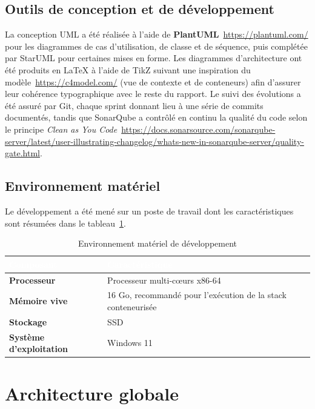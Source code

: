 \documentclass[12pt,a4paper]{report}
\renewcommand{\thead}[1]{\cellcolor{espritblue}\textcolor{white}{\textbf{#1}}}
\begin{document}
\subsection{Outils de conception et de développement}

La conception UML a été réalisée à l'aide de \textbf{PlantUML}~\url{https://plantuml.com/}
pour les diagrammes de cas d'utilisation, de classe et de séquence, puis
complétée par StarUML pour certaines mises en forme. Les diagrammes
d'architecture ont été produits en \LaTeX{} à l'aide de TikZ suivant une
inspiration du modèle~\url{https://c4model.com/} (vue de contexte et de conteneurs) afin
d'assurer leur cohérence typographique avec le reste du rapport. Le suivi
des évolutions a été assuré par Git, chaque sprint donnant lieu à une série
de commits documentés, tandis que SonarQube a contrôlé en continu la
qualité du code selon le principe \textit{Clean as You
  Code}~\url{https://docs.sonarsource.com/sonarqube-server/latest/user-illustrating-changelog/whats-new-in-sonarqube-server/quality-gate.html}.

\subsection{Environnement matériel}

Le développement a été mené sur un poste de travail dont les caractéristiques
sont résumées dans le tableau~\ref{tab:materiel}.

\begin{table}[H]
\centering
\caption{Environnement matériel de développement}
\label{tab:materiel}
{\small\renewcommand{\arraystretch}{1.15}
\begin{tabularx}{\textwidth}{>{\bfseries}p{4cm} X}
\toprule
\thead{Composant} & \thead{Caractéristique} \\
\midrule
Processeur & Processeur multi-cœurs x86-64 \\
Mémoire vive & 16 Go, recommandé pour l'exécution de la stack conteneurisée \\
Stockage & SSD \\
Système d'exploitation & Windows 11 \\
\bottomrule
\end{tabularx}}
\end{table}

\section{Architecture globale}
\end{document}
